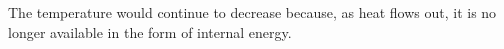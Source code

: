 The temperature would continue to decrease because, as heat flows out, it is no longer available in the form of internal energy.